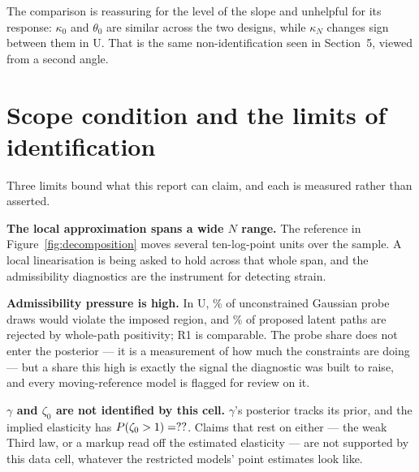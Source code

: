 \documentclass[11pt]{article}
\begin{document}
\par\medskip


\par\medskip\noindent
The comparison is reassuring for the level of the slope and unhelpful for its
response: $\kappa_0$ and $\theta_0$ are similar across the two designs, while
$\kappa_N$ changes sign between them in U. That is the same non-identification
seen in Section~5, viewed from a second angle.

\section{Scope condition and the limits of identification}
Three limits bound what this report can claim, and each is measured rather than
asserted.

\textbf{The local approximation spans a wide $N$ range.} The reference in
Figure~\ref{fig:decomposition} moves several ten-log-point units over the
sample. A local linearisation is being asked to hold across that whole span,
and the admissibility diagnostics are the instrument for detecting strain.

\textbf{Admissibility pressure is high.} In U, \TheoryUProbePercent\% of
unconstrained Gaussian probe draws would violate the imposed region, and
\TheoryUStateRejectPercent\% of proposed latent paths are rejected by whole-path
positivity; R1 is comparable. The probe share does not enter the posterior --- it
is a measurement of how much the constraints are doing --- but a share this high
is exactly the signal the diagnostic was built to raise, and every moving-reference
model is flagged for review on it.

\textbf{$\gamma$ and $\zeta_0$ are not identified by this cell.} $\gamma$'s
posterior tracks its prior, and the implied elasticity has
$P(\zeta_0>1)=??$. Claims that rest on either --- the weak
Third law, or a markup read off the estimated elasticity --- are not supported by
this data cell, whatever the restricted models' point estimates look like.

\par\medskip

\label{tab:admissibility}
\end{document}
